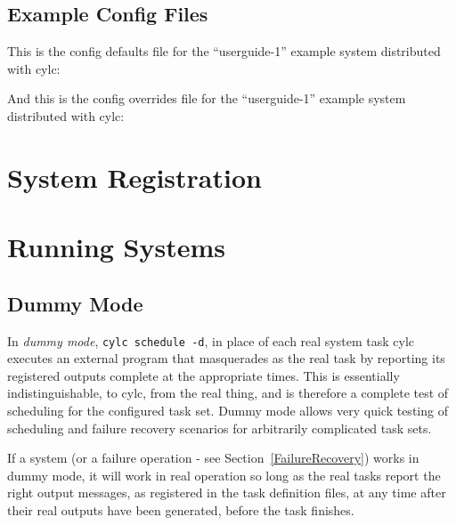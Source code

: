 \documentclass[11pt,a4paper]{article}
\begin{document}
\pagebreak

\subsection{Example Config Files}
\label{ExampleConfigFile}

This is the config defaults file for the ``userguide-1'' example system
distributed with cylc: 

\lstset{ language=Python }
{

}

\pagebreak
And this is the config overrides file for the ``userguide-1'' example
system distributed with cylc: 

\lstset{ language=Python }
{

}



\lstset{language=}

\pagebreak
\section{System Registration}
\label{SystemRegistration}


\section{Running Systems}
\label{RunningdSystems}

\subsection{Dummy Mode} 
\label{DummyMode}

In {\em dummy mode}, \lstinline=cylc schedule -d=, in place of each real
system task cylc executes an external program that masquerades as the
real task by reporting its registered outputs complete at the appropriate
times. This is essentially indistinguishable, to cylc, from the real
thing, and is therefore a complete test of scheduling for the configured
task set. Dummy mode allows very quick testing of scheduling and failure
recovery scenarios for arbitrarily complicated task sets.

If a system (or a failure operation - see Section~\ref{FailureRecovery})
works in dummy mode, it will work in real operation so long as the 
real tasks report the right output messages, as registered in the task
definition files, at any time after their real outputs have been
generated, before the task finishes.
\end{document}
